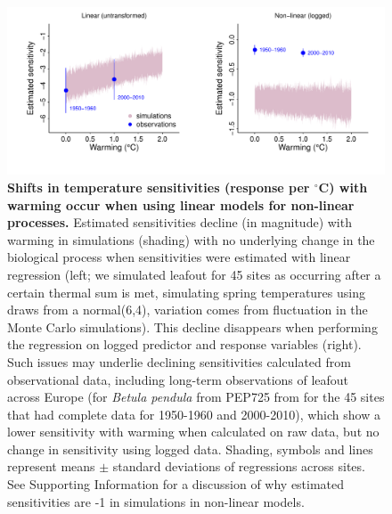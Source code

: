 \documentclass[11pt,letter]{article}
\begin{document}
\begin{figure}[h!]
\centering
\noindent \includegraphics[width=1.05\textwidth]{..//analyses/figures/basicsimsandpepalt1.pdf} %
\caption{\textbf{Shifts in temperature sensitivities (response per $^{\circ}$C) with warming occur when using linear models for non-linear processes.} Estimated sensitivities decline (in magnitude) with warming in simulations (shading) with no underlying change in the biological process when sensitivities were estimated with linear regression (left; we simulated leafout for 45 sites as occurring after a certain thermal sum is met, simulating spring temperatures using draws from a normal(6,4), variation comes from fluctuation in the Monte Carlo simulations). This decline disappears when performing the regression on logged predictor and response variables (right). Such issues may underlie declining sensitivities calculated from observational data, including long-term observations of leafout across Europe (for \emph{Betula pendula} from PEP725 from for the 45 sites that had complete data for 1950-1960 and 2000-2010), which show a lower sensitivity with warming when calculated on raw data, but no change in sensitivity using logged data. Shading, symbols and lines represent means $\pm$ standard deviations of regressions across sites. See Supporting Information for a discussion of why estimated sensitivities are -1 in simulations in non-linear models.} %
\label{fig:basicsimswpep} %
\end{figure}
\end{document}
